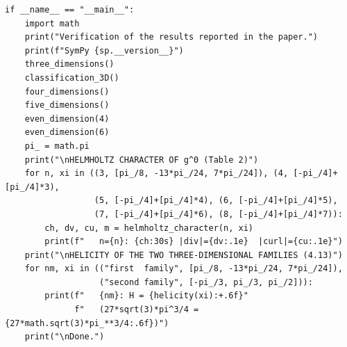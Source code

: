 \documentclass[11pt]{jfm}
\numberwithin{equation}{section}
\begin{document}
\begin{verbatim}
if __name__ == "__main__":
    import math
    print("Verification of the results reported in the paper.")
    print(f"SymPy {sp.__version__}")
    three_dimensions()
    classification_3D()
    four_dimensions()
    five_dimensions()
    even_dimension(4)
    even_dimension(6)
    pi_ = math.pi
    print("\nHELMHOLTZ CHARACTER OF g^0 (Table 2)")
    for n, xi in ((3, [pi_/8, -13*pi_/24, 7*pi_/24]), (4, [-pi_/4]+[pi_/4]*3),
                  (5, [-pi_/4]+[pi_/4]*4), (6, [-pi_/4]+[pi_/4]*5),
                  (7, [-pi_/4]+[pi_/4]*6), (8, [-pi_/4]+[pi_/4]*7)):
        ch, dv, cu, m = helmholtz_character(n, xi)
        print(f"   n={n}: {ch:30s} |div|={dv:.1e}  |curl|={cu:.1e}")
    print("\nHELICITY OF THE TWO THREE-DIMENSIONAL FAMILIES (4.13)")
    for nm, xi in (("first  family", [pi_/8, -13*pi_/24, 7*pi_/24]),
                   ("second family", [-pi_/3, pi_/3, pi_/2])):
        print(f"   {nm}: H = {helicity(xi):+.6f}"
              f"   (27*sqrt(3)*pi^3/4 = {27*math.sqrt(3)*pi_**3/4:.6f})")
    print("\nDone.")
\end{verbatim}\endgroup
\endgroup
\end{document}
